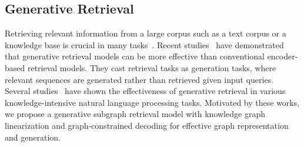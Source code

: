 

\subsection{Generative Retrieval}

Retrieving relevant information from a large corpus such as a text corpus or a knowledge base is crucial in many tasks~\cite{ChenFWB17,ThorneVCM18,lewis2020retrieval,IzacardG21}.
Recent studies~\cite{de2021autoregressive,bevilacqua2022autoregressive,wang2022neural,lee2022generative,lee2023contextualized} have demonstrated that generative retrieval models can be more effective than conventional encoder-based retrieval models. %
They cast retrieval tasks as generation tasks, where relevant sequences are generated rather than retrieved given input queries.
Several studies~\cite{chen2022gere,thorne2022data,lee2022generative,yu2023generate,xu-etal-2023-unsupervised,luo2024reasoning} have shown the effectiveness of generative retrieval in various knowledge-intensive natural language processing tasks.
Motivated by these works, we propose a generative subgraph retrieval model with knowledge graph linearization and graph-constrained decoding for effective graph representation and generation.

